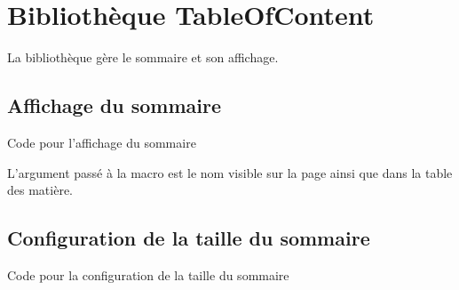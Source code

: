 \chapter{Bibliothèque TableOfContent}

La bibliothèque  gère le sommaire et son affichage.


\section{Affichage du sommaire}

\begin{Latex}{Code pour l'affichage du sommaire}
\end{Latex}

L'argument passé à la macro est le nom visible sur la page ainsi que dans la table des matière.


\section{Configuration de la taille du sommaire}

\begin{Latex}{Code pour la configuration de la taille du sommaire}
\smallTableOfContent
\end{Latex}


